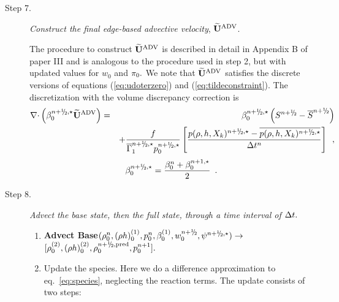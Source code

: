 \begin{description}
\begin{enumerate}
\end{enumerate}

\item[Step 7.] {\em Construct the final edge-based advective velocity}, $\widetilde{\mathbf{U}}^{\mathrm{ADV}}$.

The procedure to construct $\widetilde{\mathbf{U}}^{\mathrm{ADV}}$ is described in detail in Appendix B of paper III
and is analogous to the procedure used in step 2, but with updated values
for $w_0$ and $\pi_0.$  We note that $\widetilde{\mathbf{U}}^{\mathrm{ADV}}$ satisfies the discrete versions of 
equations (\ref{eq:udoterzero}) and (\ref{eq:tildeconstraint}).   The discretization
with the volume discrepancy correction is
\begin{eqnarray}
\nablab \cdotb \left(\beta_0^{\nph,\star} \uadvtwo\right) &=& 
\beta_0^{\nph,\star} \left(S^{\nph} - \overline{S}^{\nph}\right) \nonumber \\
&& + \frac{f}{\gammabar^{\nph,\star} p_0^{\nph,\star}}
\left[\frac{p(\rho,h,X_k)^{\nph,\star} - \overline{p(\rho,h,X_k)^{\nph,\star}}}{\Delta t^n}\right]
\enskip , \nonumber \\
\end{eqnarray}
\begin{equation}
\beta_0^{\nph,\star} = \frac{ \beta_0^n +  \beta_0^{n+1,\star} }{2} \enskip .
\end{equation}

\item[Step 8.] {\em Advect the base state, then the full state, through a time interval of $\Delta t.$}

\begin{enumerate}
\renewcommand{\theenumi}{{\bf \alph{enumi}}}

\item {\bf Advect Base}$(\rho_0^{n}, (\rho h)_0^{(1)}, p_0^{n}, \beta_0^{(1)}, w_0^{\nph}, \psi^{\nph,\star} ) \rightarrow $
$[\rho_0^{(2)}, (\rho h)_0^{(2)}, \rho_0^{\nph,{\rm pred}}, p_0^{n+1}].$ 

\item Update the species.  Here we do a difference approximation to
  eq.~\ref{eq:species}, neglecting the reaction terms.  The
  update consists of two steps:

  \begin{enumerate}
  \renewcommand{\labelenumii}{{\bf \roman{enumii}}.}


\end{enumerate}
\end{enumerate}
\end{description}
